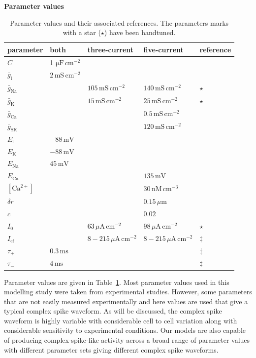 \documentclass[twocolumn]{svjour3}          %
\newcommand{\mv}{\,\mathrm{mV}}
\newcommand{\msi}{\,\mathrm{mS\,cm^{-2}}}
\newcommand{\mse}{\,\mathrm{ms}}
\newcommand{\cm}{\,\mathrm{cm}}
\renewcommand{\k}{\mathrm{K}}
\newcommand{\ca}{\mathrm{Ca}}
\newcommand{\na}{\mathrm{Na}}
\newcommand{\sk}{\mathrm{SK}}
\newcommand{\leak}{\mathrm{l}}
\begin{document}
\begin{table}[!t]
\centering
\textbf{Parameter values}
\begin{center}
  \begin{tabular}{|l l l l l|}
\hline
parameter & both & three-current & five-current &reference \\ \hline
$C$&1 $\mathrm{\mu F}\,\mathrm{cm}^{-2}$&&& \citep{RothHausser2001}\\ \hline
$\bar{g}_\leak$&$2\msi$&&& \citep{RappEtAl1994}\\ \hline
$\bar{g}_\na$&&$105\msi$&$140\msi$&  $\star$\\ \hline
$\bar{g}_\k$&&$15\msi$&$25\msi$& $\star$  \\ \hline
$\bar{g}_\ca$&&& $0.5\msi$& \citep{MiyashoEtAl2001} \\ \hline
$\bar{g}_\sk$&&&$120\msi$& \citep{RubinCleland2006}\\ \hline
$E_\leak$&$-88\mv$&&& \citep{MasoliEtAl2015}\\ \hline
$E_\k$&$-88\mv$&&& \citep{MasoliEtAl2015}\\ \hline
$E_\na$&$45\mv$&&& \citep{DeSchutterBower1994a}\\ \hline
$E_\ca$&&&$135\mv$& \citep{DeSchutterBower1994a}\\ \hline
$[\ca^{2+}]$&&&$30\, \mathrm{nM}\cm^{-3}$& \citep{KanoEtAl1995}\\ \hline
$\delta r$&&&$0.15\,\mu\mathrm{m}$& \\ \hline
$c$&&&$0.02$& \\ \hline
$I_0$&&$63\,\mu\mathrm{A}\cm^{-2}$&$98\,\mu\mathrm{A}\cm^{-2}$& $\star$\\ \hline
$I_{\mathrm{cf}}$&&$8-215\,\mu\mathrm{A}\cm^{-2}$&$8-215\,\mu\mathrm{A}\cm^{-2}$& $\ddagger$\citep{StuartHausser1994}\\ \hline
$\tau_+$&$0.3\mse$&&&  $\ddagger$\citep{StuartHausser1994}\\ \hline
$\tau_-$&$4\mse$&&& $\ddagger$\citep{StuartHausser1994}\\ \hline
\end{tabular}
\end{center}
\caption{Parameter values and their associated references. The
  parameters marks with a star ($\star$) have been handtuned.}
\label{table1}
\end{table}

Parameter values are given in Table~\ref{table1}. Most parameter
values used in this modelling study were taken from experimental
studies. However, some parameters that are not easily measured
experimentally and here values are used that give a typical complex
spike waveform. As will be discussed, the complex spike waveform is
highly variable with considerable cell to cell variation along with
considerable sensitivity to experimental conditions. Our models are
also capable of producing complex-spike-like activity across a broad
range of parameter values with different parameter sets giving
different complex spike waveforms.
\end{document}
